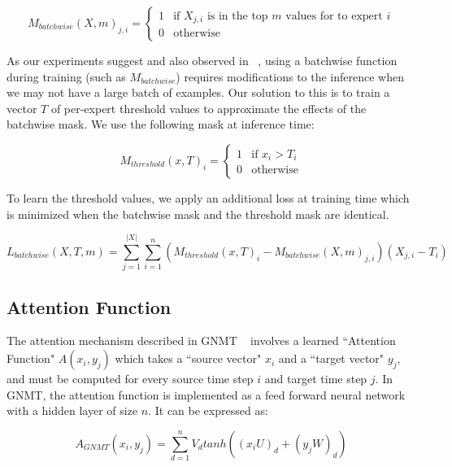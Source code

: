 \documentclass{article} %
\begin{document}
\begin{equation}\label{eq:batchwisetop_k}
M_{batchwise}(X, m)_{j,i} = \begin{cases}
            1 & \text{if $X_{j,i}$ is in the top $m$ values for to expert $i$} \\
            0 & \text{otherwise}
        \end{cases}
\end{equation}

As our experiments suggest and also observed in ~\citep{DBLP:journals/corr/IoffeS15}, using a batchwise function during training (such as $M_{batchwise}$) requires modifications to the inference when we may not have a large batch of examples. Our solution to this is to train a vector $T$ of per-expert threshold values to approximate the effects of the batchwise mask.  We use the following mask at inference time:

\begin{equation}\label{eq:threshold}
M_{threshold}(x, T)_i = \begin{cases}
            1 & \text{if $x_i > T_i$} \\
            0 & \text{otherwise}
        \end{cases}
\end{equation}

To learn the threshold values, we apply an additional loss at training time which is minimized when the batchwise mask and the threshold mask are identical.

\begin{equation}\label{eq:thresholdloss}
L_{batchwise}(X, T, m) = \sum_{j = 1}^{|X|} \sum_{i=1}^n 
(M_{threshold}(x, T)_i - M_{batchwise}(X, m)_{j,i}) (X_{j, i} - T_i)
\end{equation}

\subsection{Attention Function}\label{sec:attention} 

The attention mechanism described in GNMT ~\citep{GNMT} involves a learned ``Attention Function" $A(x_i,y_j)$ which takes a ``source vector" $x_i$ and a ``target vector" $y_j$, and must be computed for every source time step $i$ and target time step $j$.  In GNMT, the attention function is implemented as a feed forward neural network with a hidden layer of size $n$.  It can be expressed as:

\begin{equation}\label{eq:gnmtattention}
A_{GNMT}(x_i, y_j) = \sum_{d=1}^{n}V_d tanh((x_iU)_d + (y_jW)_d)
\end{equation}
\end{document}
